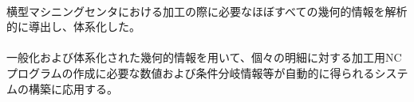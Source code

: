 {\paragraph*{\tpartconclusion}
横型マシニングセンタにおける加工の際に必要なほぼすべての幾何的情報を解析的に導出し、体系化した。
\tcbline*
\paragraph*{\tpartnextstep}
一般化および体系化された幾何的情報を用いて、個々の明細に対する加工用NCプログラムの作成に必要な数値および条件分岐情報等が自動的に得られるシステムの構築に応用する。
}














\begin{appendices}
\Appendixpart



{\small}
\end{appendices}

